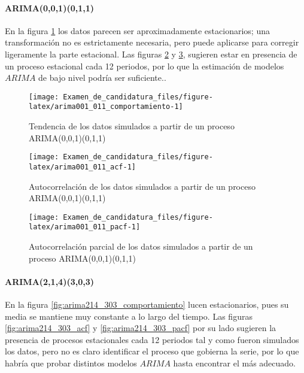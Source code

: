 \documentclass[
]{article}
\begin{document}
\paragraph{ARIMA(0,0,1)(0,1,1)}

En la figura \ref{fig:arima001_011_comportamiento} los datos parecen ser
aproximadamente estacionarios; una transformación no es estrictamente
necesaria, pero puede aplicarse para corregir ligeramente la parte
estacional. Las figuras \ref{fig:arima001_011_acf} y
\ref{fig:arima001_011_pacf}, sugieren estar en presencia de un proceso
estacional cada 12 periodos, por lo que la estimación de modelos
\(ARIMA\) de bajo nivel podría ser suficiente..

\begin{figure}[H]
\texttt{[image: Examen\_de\_candidatura\_files/figure-latex/arima001\_011\_comportamiento-1]} \caption{Tendencia de los datos simulados a partir de un proceso ARIMA(0,0,1)(0,1,1)}\label{fig:arima001_011_comportamiento}
\end{figure}

\begin{figure}[H]
\texttt{[image: Examen\_de\_candidatura\_files/figure-latex/arima001\_011\_acf-1]} \caption{Autocorrelación de los datos simulados a partir de un proceso ARIMA(0,0,1)(0,1,1)}\label{fig:arima001_011_acf}
\end{figure}

\begin{figure}[H]
\texttt{[image: Examen\_de\_candidatura\_files/figure-latex/arima001\_011\_pacf-1]} \caption{Autocorrelación parcial de los datos simulados a partir de un proceso ARIMA(0,0,1)(0,1,1)}\label{fig:arima001_011_pacf}
\end{figure}

\paragraph{ARIMA(2,1,4)(3,0,3)}

En la figura \ref{fig:arima214_303_comportamiento} lucen estacionarios,
pues su media se mantiene muy constante a lo largo del tiempo. Las
figuras \ref{fig:arima214_303_acf} y \ref{fig:arima214_303_pacf} por su
lado sugieren la presencia de procesos estacionales cada 12 periodos tal
y como fueron simulados los datos, pero no es claro identificar el
proceso que gobierna la serie, por lo que habría que probar distintos
modelos \(ARIMA\) hasta encontrar el más adecuado.
\end{document}
